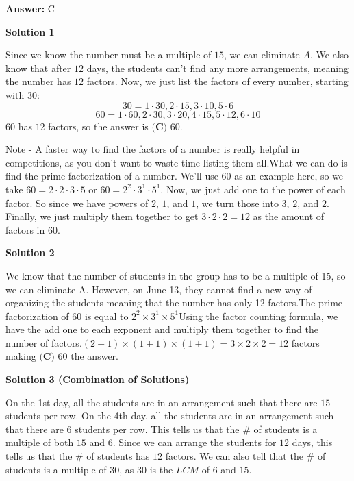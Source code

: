 \begin{enumerate}
 \textbf{Answer: }C



\textbf{Solution 1}

Since we know the number must be a multiple of $15$, we can eliminate $A$. We also know that after $12$ days, the students can't find any more arrangements, meaning the number has $12$ factors. Now, we just list the factors of every number, starting with $30$:
 \[30=1\cdot30, 2\cdot15, 3\cdot10, 5\cdot6\]
 \[60=1\cdot60, 2\cdot30, 3\cdot20, 4\cdot15, 5\cdot12, 6\cdot10\]$60$ has $12$ factors, so the answer is $\boxed{\textbf{(C) } 60}$.

 Note - A faster way to find the factors of a number is really helpful in competitions, as you don't want to waste time listing them all.What we can do is find the prime factorization of a number. We'll use $60$ as an example here, so we take $60 = 2 \cdot 2 \cdot 3 \cdot 5$ or $60 = 2^2 \cdot 3^1 \cdot 5^1$. Now, we just add one to the power of each factor. So since we have powers of $2$, $1$, and $1$, we turn those into $3$, $2$, and $2$. Finally, we just multiply them together to get $3 \cdot 2 \cdot 2 = 12$ as the amount of factors in 60.

 



\textbf{Solution 2}

We know that the number of students in the group has to be a multiple of 15, so we can eliminate A. However, on June 13, they cannot find a new way of organizing the students meaning that the number has only 12 factors.The prime factorization of 60 is equal to $2^2 \times 3^1 \times 5^1$Using the factor counting formula, we have the add one to each exponent and multiply them together to find the number of factors.$(2+1) \times (1+1) \times (1+1) = 3 \times 2 \times 2 = 12$ factors making $\boxed{\textbf{(C) } 60}$ the answer.

 



\textbf{Solution 3 (Combination of Solutions)}

On the 1st day, all the students are in an arrangement such that there are $15$ students per row. On the 4th day, all the students are in an arrangement such that there are $6$ students per row. This tells us that the \# of students is a multiple of both $15$ and $6$. Since we can arrange the students for $12$ days, this tells us that the \# of students has $12$ factors. We can also tell that the \# of students is a multiple of $30$, as $30$ is the $LCM$ of $6$ and $15$. 


\end{enumerate}
